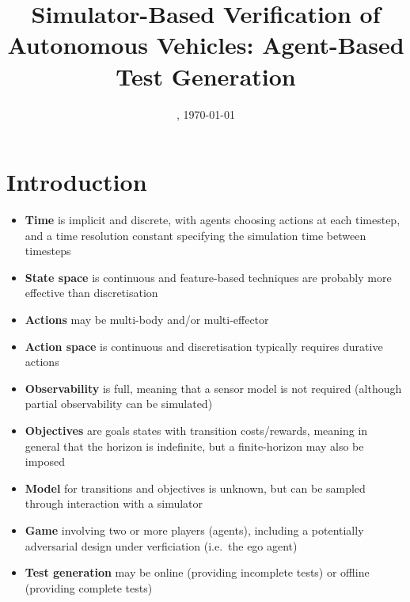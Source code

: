 \documentclass[10pt]{article}
\title{Simulator-Based Verification of Autonomous Vehicles: Agent-Based Test Generation}
\author{}
\date{\DTMcurrenttime, \today}
\theoremstyle{plain}
\begin{document}
\maketitle

\section{Introduction}

\begin{itemize}
    \item \textbf{Time} is implicit and discrete, with agents choosing actions at each timestep, and a time resolution constant specifying the simulation time between timesteps
    \item \textbf{State space} is continuous and feature-based techniques are probably more effective than discretisation
    \item \textbf{Actions} may be multi-body and/or multi-effector
    \item \textbf{Action space} is continuous and discretisation typically requires durative actions
    \item \textbf{Observability} is full, meaning that a sensor model is not required (although partial observability can be simulated)
    \item \textbf{Objectives} are goals states with transition costs/rewards, meaning in general that the horizon is indefinite, but a finite-horizon may also be imposed
    \item \textbf{Model} for transitions and objectives is unknown, but can be sampled through interaction with a simulator
    \item \textbf{Game} involving two or more players (agents), including a potentially adversarial design under verficiation (i.e.\ the ego agent)
    \item \textbf{Test generation} may be online (providing incomplete tests) or offline (providing complete tests)
\end{itemize}
\end{document}
